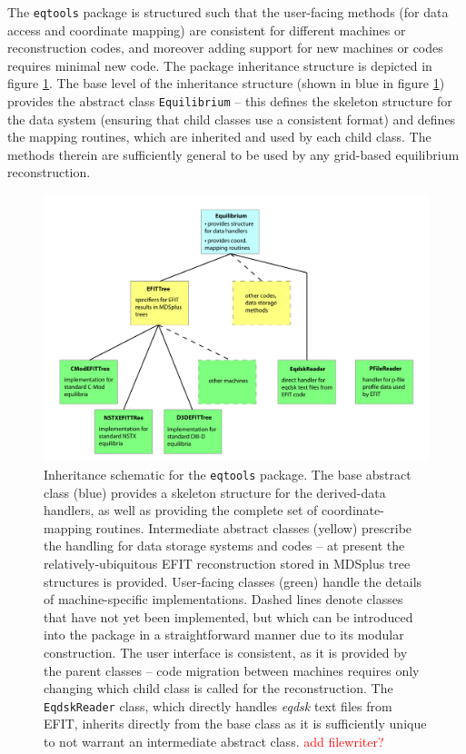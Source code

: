 \documentclass[12pt,floatfix,showpacs]{revtex4-1}
\newcommand{\note}[1]{\textcolor{red}{#1}}
\newcommand{\eqtools}{\texttt{eqtools}\xspace}
\begin{document}
The \eqtools package is structured such that the user-facing methods (for data access and coordinate mapping) are consistent for different machines or reconstruction codes, and moreover adding support for new machines or codes requires minimal new code.  
The package inheritance structure is depicted in figure \ref{fig:flowchart}.  
The base level of the inheritance structure (shown in blue in figure \ref{fig:flowchart}) provides the abstract class \verb|Equilibrium| -- this defines the skeleton structure for the data system (ensuring that child classes use a consistent format) and defines the mapping routines, which are inherited and used by each child class.  
The methods therein are sufficiently general to be used by any grid-based equilibrium reconstruction.

\begin{figure}[p]
 \includegraphics[width=\textwidth]{graphics/flowchart.pdf}
 \caption{Inheritance schematic for the \eqtools package.  The base abstract class (blue) provides a skeleton structure for the derived-data handlers, as well as providing the complete set of coordinate-mapping routines.  Intermediate abstract classes (yellow) prescribe the handling for data storage systems and codes -- at present the relatively-ubiquitous EFIT reconstruction stored in MDSplus tree structures is provided.  User-facing classes (green) handle the details of machine-specific implementations.  Dashed lines denote classes that have not yet been implemented, but which can be introduced into the package in a straightforward manner due to its modular construction.  The user interface is consistent, as it is provided by the parent classes -- code migration between machines requires only changing which child class is called for the reconstruction.  The \texttt{EqdskReader} class, which directly handles \emph{eqdsk} text files from EFIT, inherits directly from the base class as it is sufficiently unique to not warrant an intermediate abstract class.  \note{add filewriter?}}
 \label{fig:flowchart}
\end{figure}
\end{document}
